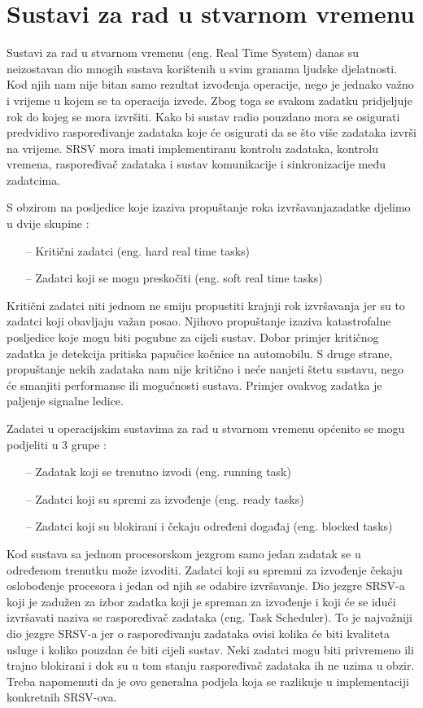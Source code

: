 \documentclass[../zavrsni.tex]{subfiles}
\begin{document}
\section{Sustavi za rad u stvarnom vremenu}

Sustavi za rad u stvarnom vremenu (eng. Real Time System) danas su neizostavan dio mnogih sustava korištenih u svim
granama ljudske djelatnosti. Kod njih nam nije bitan samo rezultat izvođenja operacije, nego je jednako važno 
i vrijeme u kojem se ta operacija izvede. Zbog toga se svakom zadatku pridjeljuje rok do kojeg se mora izvršiti.
Kako bi sustav radio pouzdano mora se osigurati predvidivo raspoređivanje zadataka koje će osigurati da se što više 
zadataka izvrši na vrijeme.
SRSV mora imati implementiranu kontrolu zadataka, kontrolu vremena, raspoređivač zadataka i sustav komunikacije i sinkronizacije
među zadatcima.

S obzirom na posljedice koje izaziva propuštanje roka izvršavanjazadatke djelimo u dvije skupine :
\begin{itemize}
    \item[--] Kritični zadatci (eng. hard real time tasks)
    \item[--] Zadatci koji se mogu preskočiti (eng. soft real time tasks)
\end{itemize}
Kritični zadatci niti jednom ne smiju propustiti krajnji rok izvršavanja jer su to zadatci koji obavljaju važan posao. Njihovo 
propuštanje izaziva katastrofalne posljedice koje mogu biti pogubne za cijeli sustav. Dobar primjer kritičnog zadatka je detekcija 
pritiska papučice kočnice na automobilu. S druge strane, propuštanje nekih zadataka
nam nije kritično i neće nanjeti štetu sustavu, nego će smanjiti performanse ili mogućnosti sustava. Primjer ovakvog zadatka je 
paljenje signalne ledice.

Zadatci u operacijskim sustavima za rad u stvarnom vremenu općenito se mogu podjeliti u 3 grupe :
\begin{itemize}
    \item[--] Zadatak koji se trenutno izvodi (eng. running task)
    \item[--] Zadatci koji su spremi za izvođenje (eng. ready tasks)
    \item[--] Zadatci koji su blokirani i čekaju određeni događaj (eng. blocked tasks)
\end{itemize}

Kod sustava sa jednom procesorskom jezgrom samo jedan zadatak se u određenom trenutku može izvoditi. Zadatci koji su spremni za izvođenje
čekaju oslobođenje procesora i jedan od njih se odabire izvršavanje.
Dio jezgre SRSV-a koji je zadužen za izbor zadatka koji je spreman za izvođenje i koji će se idući izvršavati naziva se raspoređivač 
zadataka (eng. Task Scheduler). To je najvažniji dio jezgre SRSV-a jer o raspoređivanju zadataka ovisi kolika će biti kvaliteta usluge i
koliko pouzdan će biti cijeli sustav.
Neki zadatci mogu biti privremeno ili trajno blokirani i dok su u tom stanju raspoređivač zadataka ih ne uzima u obzir.
Treba napomenuti da je ovo generalna podjela koja se razlikuje u implementaciji konkretnih SRSV-ova.
\end{document}

